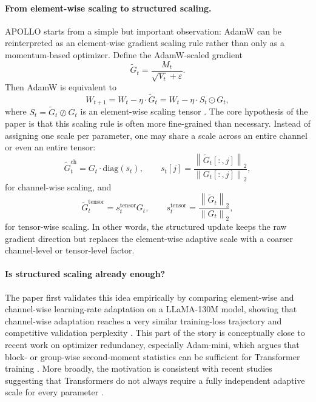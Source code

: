 \documentclass[10pt]{article}
\begin{document}
\paragraph{From element-wise scaling to structured scaling.}
APOLLO starts from a simple but important observation: AdamW can be reinterpreted as an element-wise gradient scaling rule rather than only as a momentum-based optimizer. Define the AdamW-scaled gradient
\begin{equation}
\widetilde{G}_t = \frac{M_t}{\sqrt{V_t} + \varepsilon}.
\end{equation}
Then AdamW is equivalent to
\begin{equation}
W_{t+1} = W_t - \eta \cdot \widetilde{G}_t
= W_t - \eta \cdot S_t \odot G_t,
\end{equation}
where $S_t = \widetilde{G}_t \oslash G_t$ is an element-wise scaling tensor \cite{apollo2025}. The core hypothesis of the paper is that this scaling rule is often more fine-grained than necessary. Instead of assigning one scale per parameter, one may share a scale across an entire channel or even an entire tensor:
\begin{equation}
\widetilde{G}_t^{\text{ch}} = G_t \cdot \mathrm{diag}(s_t), \qquad
s_t[j] = \frac{\left\| \widetilde{G}_t[:,j] \right\|_2}{\left\| G_t[:,j] \right\|_2},
\end{equation}
for channel-wise scaling, and
\begin{equation}
\widetilde{G}_t^{\text{tensor}} = s_t^{\text{tensor}} G_t, \qquad
s_t^{\text{tensor}} = \frac{\left\| \widetilde{G}_t \right\|_2}{\left\| G_t \right\|_2},
\end{equation}
for tensor-wise scaling. In other words, the structured update keeps the raw gradient direction but replaces the element-wise adaptive scale with a coarser channel-level or tensor-level factor.

\paragraph{Is structured scaling already enough?}
The paper first validates this idea empirically by comparing element-wise and channel-wise learning-rate adaptation on a LLaMA-130M model, showing that channel-wise adaptation reaches a very similar training-loss trajectory and competitive validation perplexity \cite{apollo2025}. This part of the story is conceptually close to recent work on optimizer redundancy, especially Adam-mini, which argues that block- or group-wise second-moment statistics can be sufficient for Transformer training \cite{zhang2024adammini}. More broadly, the motivation is consistent with recent studies suggesting that Transformers do not always require a fully independent adaptive scale for every parameter \cite{zhang2024transformers}.
\end{document}
